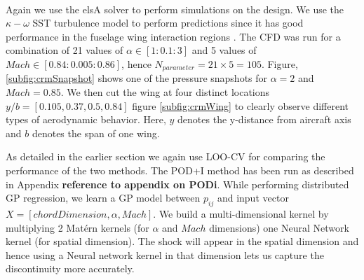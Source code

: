 Again we use the elsA\textsuperscript{\textregistered} solver to perform simulations on the design. We use the $\kappa - \omega$ SST turbulence model to perform predictions since it has good performance in the fuselage wing interaction regions \cite{menter2003ten, vassberg2014summary}. The CFD was run for a combination of 21 values of $\alpha \in [1: 0.1: 3]$ and 5 values of $Mach \in [0.84: 0.005: 0.86]$, hence $N_{parameter} = 21\times5 = 105$. Figure, \ref{subfig:crmSnapshot} shows one of the pressure snapshots for $\alpha = 2$ and $Mach = 0.85$. We then cut the wing at four distinct locations $y/b = [0.105, 0.37, 0.5, 0.84]$ figure \ref{subfig:crmWing} to clearly observe different types of aerodynamic behavior. Here, $y$ denotes the y-distance from aircraft axis and $b$ denotes the span of one wing. 

As detailed in the earlier section we again use LOO-CV for comparing the performance of the two methods. The POD+I method has been run as described in Appendix \textbf{reference to appendix on PODi}. While performing distributed GP regression, we learn a GP model between $p_{ij}$ and input vector $X = [chordDimension, \alpha, Mach]$. We build a multi-dimensional kernel by multiplying 2 Mat\'ern kernels (for $\alpha$ and $Mach$ dimensions) one Neural Network kernel (for spatial dimension). The shock will appear in the spatial dimension and hence using a Neural network kernel in that dimension lets us capture the discontinuity more accurately. 

